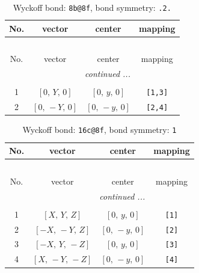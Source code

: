 \documentclass[fleqn,8pt]{jsarticle}
\begin{document}
\renewcommand{\arraystretch}{1.2}
\begin{longtable}{cccc}
\caption{Wyckoff bond: {\tt 8b@8f}, bond symmetry: {\tt .2.}}
 \\
 \hline \hline
No. & vector & center & mapping \\ \hline \endfirsthead

\multicolumn{3}{l}{\tablename\ \thetable{}} \\
 \hline \hline
No. & vector & center & mapping \\ \hline \endhead

 \hline \hline
\multicolumn{3}{r}{\footnotesize\it continued ...} \\ \endfoot

 \hline \hline
\multicolumn{3}{r}{} \\ \endlastfoot

1 & $\left[ 0,\, Y,\, 0 \right]$ & $\left[ 0,\, y,\, 0 \right]$ & {\tt [1,3]} \\ \hline
2 & $\left[ 0,\, - Y,\, 0 \right]$ & $\left[ 0,\, - y,\, 0 \right]$ & {\tt [2,4]} \\
\end{longtable}
\renewcommand{\arraystretch}{1.2}
\begin{longtable}{cccc}
\caption{Wyckoff bond: {\tt 16c@8f}, bond symmetry: {\tt 1}}
 \\
 \hline \hline
No. & vector & center & mapping \\ \hline \endfirsthead

\multicolumn{3}{l}{\tablename\ \thetable{}} \\
 \hline \hline
No. & vector & center & mapping \\ \hline \endhead

 \hline \hline
\multicolumn{3}{r}{\footnotesize\it continued ...} \\ \endfoot

 \hline \hline
\multicolumn{3}{r}{} \\ \endlastfoot

1 & $\left[ X,\, Y,\, Z \right]$ & $\left[ 0,\, y,\, 0 \right]$ & {\tt [1]} \\ \hline
2 & $\left[ - X,\, - Y,\, Z \right]$ & $\left[ 0,\, - y,\, 0 \right]$ & {\tt [2]} \\ \hline
3 & $\left[ - X,\, Y,\, - Z \right]$ & $\left[ 0,\, y,\, 0 \right]$ & {\tt [3]} \\ \hline
4 & $\left[ X,\, - Y,\, - Z \right]$ & $\left[ 0,\, - y,\, 0 \right]$ & {\tt [4]} \\
\end{longtable}
\end{document}
